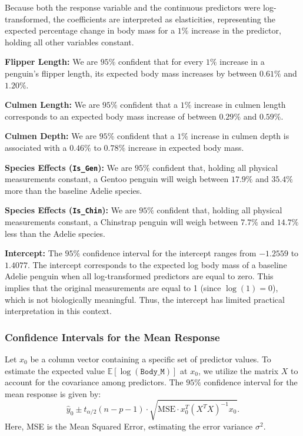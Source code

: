 \documentclass[12pt]{article}
\begin{document}
  Because both the response variable and the continuous predictors were
  log-transformed, the coefficients are interpreted as
  elasticities, representing the expected percentage change in
  body mass for a $1\%$ increase in the predictor,
  holding all other variables constant.
  \begin{itemize}
      \ii \textbf{Flipper Length:} We are $95\%$ confident that for every $1\%$
      increase in a penguin's flipper length,
      its expected body mass increases by between $0.61\%$ and $1.20\%$.

      \ii \textbf{Culmen Length:} We are $95\%$ confident that a $1\%$
      increase in culmen length corresponds to an expected body mass
      increase of between $0.29\%$ and $0.59\%$.

      \ii \textbf{Culmen Depth:} We are $95\%$ confident that a $1\%$
      increase in culmen depth is associated with a
      $0.46\%$ to $0.78\%$ increase in expected body mass.

      \ii \textbf{Species Effects (\texttt{Is\_Gen}):}
      We are $95\%$ confident that,
      holding all physical measurements constant,
      a Gentoo penguin will weigh between $17.9\%$ and $35.4\%$
      more than the baseline Adelie species.

      \ii \textbf{Species Effects (\texttt{Is\_Chin}):}
      We are $95\%$ confident that,
      holding all physical measurements constant,
      a Chinstrap penguin will weigh between $7.7\%$ and $14.7\%$
      less than the Adelie species.

      \ii \textbf{Intercept:} The $95\%$ confidence interval
      for the intercept ranges from $-1.2559$ to $1.4077$.
      The intercept corresponds to the expected
      log body mass of a baseline Adelie penguin
      when all log-transformed predictors are equal to zero.
      This implies that the original
      measurements are equal to 1 (since $\log(1) = 0$),
      which is not biologically meaningful.
      Thus, the intercept has limited practical
      interpretation in this context.
  \end{itemize}

  \subsubsection{Confidence Intervals for the Mean Response}
  Let $x_0$ be
  a column vector containing a specific set of predictor
  values. To estimate the expected value $\mathbb{E}[\log(\texttt{Body\_M})]$ at
  $x_0$, we utilize the matrix $X$
  to account for the covariance among predictors. The $95\%$
  confidence interval for the mean response is given by:
  \[
    \hat{y}_0 \pm t_{\alpha/2}(n-p-1) \cdot
    \sqrt{\text{MSE} \cdot x_0^T
    (X^T X)^{-1} x_0}
    .\]
  Here, MSE is the Mean Squared Error, estimating the error
  variance $\sigma^2$.
\end{document}
